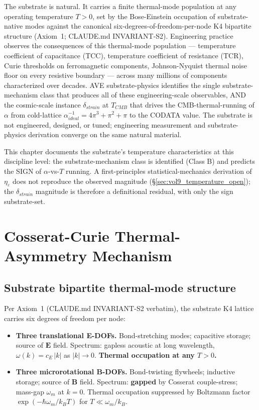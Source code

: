 The substrate is natural. It carries a finite thermal-mode population at any operating temperature $T > 0$, set by the Bose-Einstein occupation of substrate-native modes against the canonical six-degrees-of-freedom-per-node K4 bipartite structure (Axiom~1; CLAUDE.md INVARIANT-S2). Engineering practice observes the consequences of this thermal-mode population --- temperature coefficient of capacitance (TCC), temperature coefficient of resistance (TCR), Curie thresholds on ferromagnetic components, Johnson-Nyquist thermal noise floor on every resistive boundary --- across many millions of components characterized over decades. AVE substrate-physics identifies the single substrate-mechanism class that produces all of these engineering-scale observables, AND the cosmic-scale instance $\delta_{strain}$ at $T_{CMB}$ that drives the CMB-thermal-running of $\alpha$ from cold-lattice $\alpha^{-1}_{ideal} = 4\pi^3 + \pi^2 + \pi$ to the CODATA value. The substrate is not engineered, designed, or tuned; engineering measurement and substrate-physics derivation converge on the same natural material.

This chapter documents the substrate's temperature characteristics at this discipline level: the substrate-mechanism class is identified (Class B) and predicts the SIGN of $\alpha$-vs-$T$ running. A first-principles statistical-mechanics derivation of $\eta_\varepsilon$ does not reproduce the observed magnitude (\S\ref{sec:vol9_temperature_open}); the $\delta_{strain}$ magnitude is therefore a definitional residual, with only the sign substrate-set.

\section{Cosserat-Curie Thermal-Asymmetry Mechanism}
\label{sec:vol9_cosserat_curie_mechanism}

\subsection{Substrate bipartite thermal-mode structure}
\label{subsec:vol9_bipartite_modes}

Per Axiom~1 (CLAUDE.md INVARIANT-S2 verbatim), the substrate K4 lattice carries six degrees of freedom per node:

\begin{itemize}
    \item \textbf{Three translational E-DOFs.} Bond-stretching modes; capacitive storage; source of $\mathbf{E}$ field. Spectrum: gapless acoustic at long wavelength, $\omega(k) = c_E\,|k|$ as $|k| \to 0$. \textbf{Thermal occupation at any $T > 0$.}
    \item \textbf{Three microrotational B-DOFs.} Bond-twisting flywheels; inductive storage; source of $\mathbf{B}$ field. Spectrum: \textbf{gapped} by Cosserat couple-stress; mass-gap $\omega_m$ at $k = 0$. Thermal occupation suppressed by Boltzmann factor $\exp(-\hbar\omega_m/k_B T)$ for $T \ll \omega_m/k_B$.
\end{itemize}

